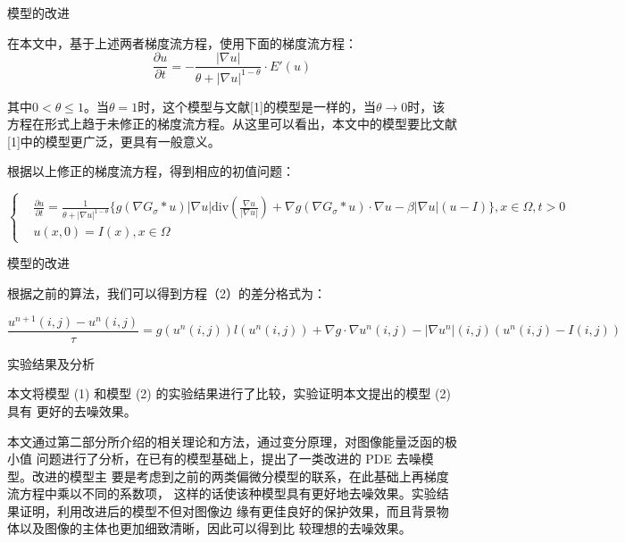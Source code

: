 \documentclass{beamer}
\begin{document}
\begin{frame}{{\fangsong 模型的改进}}
\begin{footnotesize}
{\kaishu 在本文中，基于上述两者梯度流方程，使用下面的梯度流方程：}
$$\frac{\partial u}{\partial t}=-\frac{|\nabla u|}{\theta+|\nabla u|^{1-\theta}}\cdot E'(u)$$

{\kaishu 其中$0<\theta\leq 1$。当$\theta=1$时，这个模型与文献[1]的模型是一样的，当$\theta\rightarrow 0$时，该方程在形式上趋于未修正的梯度流方程。从这里可以看出，本文中的模型要比文献[1]中的模型更广泛，更具有一般意义。}

{\kaishu 根据以上修正的梯度流方程，得到相应的初值问题：}
\begin{tiny}
\begin{equation}
\left\{
\begin{aligned}
&\frac{\partial u}{\partial t}=  \frac{1}{\theta+|\nabla u|^{1-\theta}}\{g(\nabla G_{\sigma}*u)|\nabla u|\mathrm{div}\left(\frac{\nabla u}{|\nabla u|}\right)+\nabla g(\nabla G_{\sigma}*u)\cdot\nabla u-\beta|\nabla u|(u-I)\}, x\in\varOmega,t>0\\
&u(x,0) =I(x),x\in\varOmega
\end{aligned}
\right.
\end{equation}
\end{tiny}
\end{footnotesize}
\end{frame}
\begin{frame}{{\fangsong 模型的改进}}

{\kaishu 根据之前的算法，我们可以得到方程（2）的差分格式为：}
\begin{scriptsize}
$$\frac{u^{n+1}(i,j)-u^{n}(i,j)}{\tau}=g(u^{n}(i,j))l(u^{n}(i,j))+\nabla g\cdot\nabla u^{n}(i,j)-|\nabla u^{n}|(i,j)(u^{n}(i,j)-I(i,j))$$
\end{scriptsize}
\end{frame}
\begin{frame}{\fangsong 实验结果及分析}
\begin{footnotesize}
{\kaishu 本文将模型 (1) 和模型 (2) 的实验结果进行了比较，实验证明本文提出的模型 (2) 具有
更好的去噪效果。}

{\kaishu 本文通过第二部分所介绍的相关理论和方法，通过变分原理，对图像能量泛函的极小值
问题进行了分析，在已有的模型基础上，提出了一类改进的 PDE 去噪模型。改进的模型主
要是考虑到之前的两类偏微分模型的联系，在此基础上再梯度流方程中乘以不同的系数项，
这样的话使该种模型具有更好地去噪效果。实验结果证明，利用改进后的模型不但对图像边
缘有更佳良好的保护效果，而且背景物体以及图像的主体也更加细致清晰，因此可以得到比
较理想的去噪效果。}

\end{footnotesize}
\end{frame}
\end{document}
